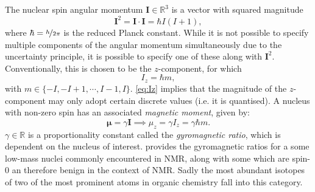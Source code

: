 The nuclear spin angular momentum $\symbf{I} \in
\mathbb{R}^3$ is a vector with squared magnitude
\begin{equation}
  \symbf{I}^2 = \symbf{I} \cdot \symbf{I} = \hbar I (I + 1),
  \label{eq:I-squared}
\end{equation}
where $\hbar = \nicefrac{h}{2 \pi}$ is the reduced Planck constant. While it
is not possible to specify multiple components of the angular momentum
simultaneously due to the uncertainty principle, it is possible to specify one
of these along with $\symbf{I}^2$. Conventionally, this is chosen to be the
$z$-component, for which
\begin{equation}
  I_z = \hbar m,
  \label{eq:Iz}
\end{equation}
with $m \in \lbrace -I, -I+1, \cdots, I - 1, I \rbrace$. \cref{eq:Iz}
implies that the magnitude of the $z$-component may only adopt certain discrete
values (i.e. it is quantised). A nucleus with non-zero spin has an associated
\textit{magnetic moment}, given by:
\begin{equation}
  \symbf{\mu} = \gamma \symbf{I} \implies \mu_z = \gamma I_z = \gamma \hbar m.
\end{equation}
$\gamma \in \mathbb{R}$ is a proportionality constant called the
\textit{gyromagnetic ratio}, which is dependent on the nucleus of interest.
 provides the gyromagnetic ratios for a some low-mass
nuclei commonly encountered in NMR, along with some which are spin-$0$ an
therefore benign in the context of \ac{NMR}. Sadly the most abundant isotopes
of two of the most prominent atoms in organic chemistry fall into this
category.

